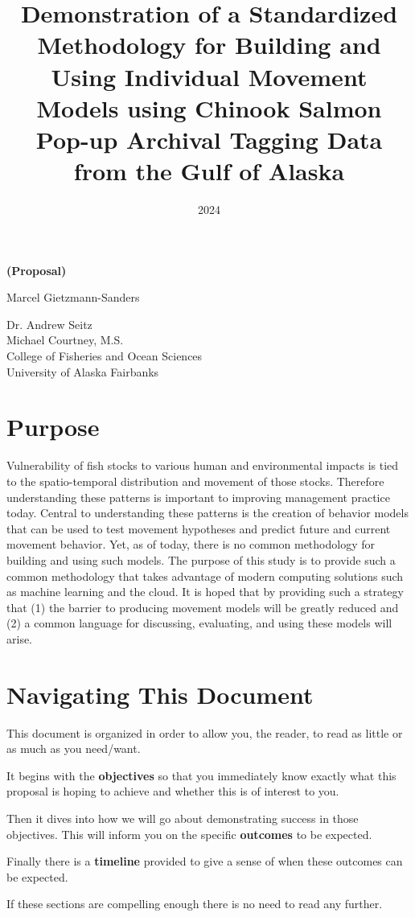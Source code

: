 \documentclass[11pt]{article}
\title{Demonstration of a Standardized Methodology for Building and Using Individual Movement Models using Chinook Salmon Pop-up Archival Tagging Data from the Gulf of Alaska}
\date{2024}
\makeatletter
\renewcommand{\maketitle}{
\begin{center}

\pagestyle{empty}
\phantom{.}  %
\vspace{3cm}

{\Large \bf \@title\par}
\vspace{1cm}

{\Large \bf (Proposal) \par}
\vspace{2.5cm}

{\LARGE Marcel Gietzmann-Sanders}\\[1cm]

{\Large\@date}

\vspace{1cm}
{\Large Dr. Andrew Seitz}\hspace{2cm}{\Large Dr. Curry Cunningham}\\[2cm]{\Large Michael Courtney, M.S.}\\[1cm]
College of Fisheries and Ocean Sciences\\
University of Alaska Fairbanks


\end{center}
}\makeatother
\makeatother
\begin{document}
\maketitle
\newpage

\section{Purpose}

Vulnerability of fish stocks to various human and environmental impacts is tied to the spatio-temporal distribution and movement of those stocks. Therefore understanding these patterns is important to improving management practice today. Central to understanding these patterns is the creation of behavior models that can be used to test movement hypotheses and predict future and current movement behavior. Yet, as of today, there is no common methodology for building and using such models. The purpose of this study is to provide such a common methodology that takes advantage of modern computing solutions such as machine learning and the cloud. It is hoped that by providing such a strategy that (1) the barrier to producing movement models will be greatly reduced and (2) a common language for discussing, evaluating, and using these models will arise. 

\newpage

\section{Navigating This Document}

This document is organized in order to allow you, the reader, to read as little or as much as you need/want. \newline

It begins with the \textbf{objectives} so that you immediately know exactly what this proposal is hoping to achieve and whether this is of interest to you.  \newline

Then it dives into how we will go about demonstrating success in those objectives. This will inform you on the specific \textbf{outcomes} to be expected. \newline

Finally there is a \textbf{timeline} provided to give a sense of when these outcomes can be expected. \newline

If these sections are compelling enough there is no need to read any further. \newline
\end{document}
